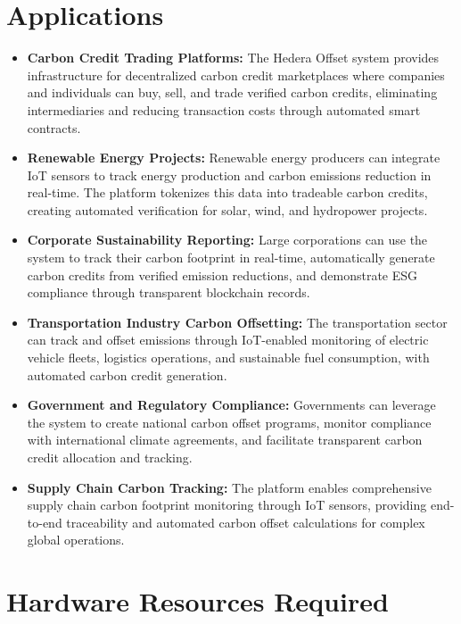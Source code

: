 \documentclass[oneside,a4paper,12pt]{book}
\begin{document}
\section{Applications}
\begin{itemize}
    \item \textbf{Carbon Credit Trading Platforms:} The Hedera Offset system provides infrastructure for decentralized carbon credit marketplaces where companies and individuals can buy, sell, and trade verified carbon credits, eliminating intermediaries and reducing transaction costs through automated smart contracts.
    
    \item \textbf{Renewable Energy Projects:} Renewable energy producers can integrate IoT sensors to track energy production and carbon emissions reduction in real-time. The platform tokenizes this data into tradeable carbon credits, creating automated verification for solar, wind, and hydropower projects.
    
    \item \textbf{Corporate Sustainability Reporting:} Large corporations can use the system to track their carbon footprint in real-time, automatically generate carbon credits from verified emission reductions, and demonstrate ESG compliance through transparent blockchain records.
    
    \item \textbf{Transportation Industry Carbon Offsetting:} The transportation sector can track and offset emissions through IoT-enabled monitoring of electric vehicle fleets, logistics operations, and sustainable fuel consumption, with automated carbon credit generation.
    
    \item \textbf{Government and Regulatory Compliance:} Governments can leverage the system to create national carbon offset programs, monitor compliance with international climate agreements, and facilitate transparent carbon credit allocation and tracking.
    
    \item \textbf{Supply Chain Carbon Tracking:} The platform enables comprehensive supply chain carbon footprint monitoring through IoT sensors, providing end-to-end traceability and automated carbon offset calculations for complex global operations.
\end{itemize}

\section{Hardware Resources Required}
\end{document}
